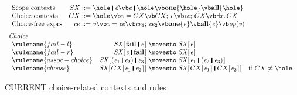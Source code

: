 \documentclass[acmsmall,review,dvipsnames,nocopyrightspace]{acmart}
\newcommand{\Conid}[1]{\mathit{#1}}
\newcommand{\Varid}[1]{\mathit{#1}}
\begin{document}
\begin{figure}
  $$
  \begin{array}{l}
    \begin{array}{lr@{\;}c@{\;}l}
    \text{Scope contexts} & SX & ::= & \ensuremath{\hole\;\rule[-0.3mm]{0.5mm}{2.5mm}\;\Varid{e}} \vb \ensuremath{\Varid{e}\;\rule[-0.3mm]{0.5mm}{2.5mm}\;\hole}
    \vb \ensuremath{\textbf{one}\{\hole\}} \vb \ensuremath{\textbf{all}\{\hole\}} \\
    \text{Choice contexts} & CX & ::= & \hole \vb \ensuremath{\Varid{v}=CX} \vb \ensuremath{CX;\,\Varid{e}} \vb \ensuremath{\Varid{ce};\,CX} \vb \ensuremath{\exists\Varid{x}.\,CX} \\
    \text{Choice-free exprs} & ce  & ::=  & \ensuremath{\Varid{v}} \vb \ensuremath{\Varid{v}=\Varid{ce}} \vb \ensuremath{\Varid{ce}_{\mathrm{1}};\,\Varid{ce}_{\mathrm{2}}}
    \vb \ensuremath{\textbf{one}\{\Varid{e}\}} \vb \ensuremath{\textbf{all}\{\Varid{e}\}}
    \vb \ensuremath{\Varid{op}(\Varid{v})}
   \end{array} \\

  \\[-2mm]

    \textit{Choice} \\
    \begin{array}{lr@{\;}c@{\;}ll}
    \rulename{fail-l} & \ensuremath{\Conid{SX} [\mskip1.5mu \textbf{fail}\;\rule[-0.3mm]{0.5mm}{2.5mm}\;\Varid{e}\mskip1.5mu]} & \movesto & \ensuremath{\Conid{SX} [\mskip1.5mu \Varid{e}\mskip1.5mu]} \\
    \rulename{fail-r} & \ensuremath{\Conid{SX} [\mskip1.5mu \Varid{e}\;\rule[-0.3mm]{0.5mm}{2.5mm}\;\textbf{fail}\mskip1.5mu]} & \movesto & \ensuremath{\Conid{SX} [\mskip1.5mu \Varid{e}\mskip1.5mu]} \\
    \rulename{assoc-choice} & \ensuremath{\Conid{SX} [\mskip1.5mu (\Varid{e}_{\mathrm{1}}\;\rule[-0.3mm]{0.5mm}{2.5mm}\;\Varid{e}_{\mathrm{2}})\;\rule[-0.3mm]{0.5mm}{2.5mm}\;\Varid{e}_{\mathrm{3}}\mskip1.5mu]} & \movesto & \ensuremath{\Conid{SX} [\mskip1.5mu \Varid{e}_{\mathrm{1}}\;\rule[-0.3mm]{0.5mm}{2.5mm}\;(\Varid{e}_{\mathrm{2}}\;\rule[-0.3mm]{0.5mm}{2.5mm}\;\Varid{e}_{\mathrm{3}})\mskip1.5mu]} \\
    \rulename{choose} & \ensuremath{\Conid{SX} [\mskip1.5mu CX [\mskip1.5mu \Varid{e}_{\mathrm{1}}\;\rule[-0.3mm]{0.5mm}{2.5mm}\;\Varid{e}_{\mathrm{2}}\mskip1.5mu]\mskip1.5mu]} & \movesto & \ensuremath{\Conid{SX} [\mskip1.5mu CX [\mskip1.5mu \Varid{e}_{\mathrm{1}}\mskip1.5mu]\;\rule[-0.3mm]{0.5mm}{2.5mm}\;CX [\mskip1.5mu \Varid{e}_{\mathrm{2}}\mskip1.5mu]\mskip1.5mu]} & \text{if}~\ensuremath{CX} \ne \hole
    \end{array} \\
   \end{array}
   $$
  \caption{CURRENT choice-related contexts and rules}
\end{figure}
\end{document}
